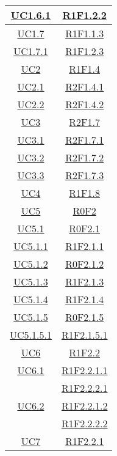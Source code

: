 \begin{longtable}{|c|c|}
	\hline
	\hyperlink{UC1.6.1}{UC1.6.1} & \hyperlink{R1F1.2.2}{R1F1.2.2}\\
	\hline
	\hyperlink{UC1.7}{UC1.7} & \hyperlink{R1F1.1.3}{R1F1.1.3}\\
	\hline
	\hyperlink{UC1.7.1}{UC1.7.1} & \hyperlink{R1F1.2.3}{R1F1.2.3}\\
	\hline
	\hyperlink{UC2}{UC2} & \hyperlink{R1F1.4}{R1F1.4}\\
	\hline
	\hyperlink{UC2.1}{UC2.1} & \hyperlink{R2F1.4.1}{R2F1.4.1}\\
	\hline
	\hyperlink{UC2.2}{UC2.2} & \hyperlink{R2F1.4.2}{R2F1.4.2}\\
	\hline
	\hyperlink{UC3}{UC3} & \hyperlink{R2F1.7}{R2F1.7}\\
	\hline
	\hyperlink{UC3.1}{UC3.1} & \hyperlink{R2F1.7.1}{R2F1.7.1}\\
	\hline
	\hyperlink{UC3.2}{UC3.2} & \hyperlink{R2F1.7.2}{R2F1.7.2}\\
	\hline
	\hyperlink{UC3.3}{UC3.3} & \hyperlink{R2F1.7.3}{R2F1.7.3}\\
	\hline
	\hyperlink{UC4}{UC4} & \hyperlink{R1F1.8}{R1F1.8}\\
	\hline
	\hyperlink{UC5}{UC5} & \hyperlink{R0F2}{R0F2}\\
	\hline
	\hyperlink{UC5.1}{UC5.1} & \hyperlink{R0F2.1}{R0F2.1}\\
	\hline
	\hyperlink{UC5.1.1}{UC5.1.1} & \hyperlink{R1F2.1.1}{R1F2.1.1}\\
	\hline
	\hyperlink{UC5.1.2}{UC5.1.2} & \hyperlink{R0F2.1.2}{R0F2.1.2}\\
	\hline
	\hyperlink{UC5.1.3}{UC5.1.3} & \hyperlink{R1F2.1.3}{R1F2.1.3}\\
	\hline
	\hyperlink{UC5.1.4}{UC5.1.4} & \hyperlink{R1F2.1.4}{R1F2.1.4}\\
	\hline
	\hyperlink{UC5.1.5}{UC5.1.5} & \hyperlink{R0F2.1.5}{R0F2.1.5}\\
	\hline
	\hyperlink{UC5.1.5.1}{UC5.1.5.1} & \hyperlink{R1F2.1.5.1}{R1F2.1.5.1}\\
	\hline
	\hyperlink{UC6}{UC6} & \hyperlink{R1F2.2}{R1F2.2}\\
	\hline
	\hyperlink{UC6.1}{UC6.1} & \hyperlink{R1F2.2.1.1}{R1F2.2.1.1}\\
	& \hyperlink{R1F2.2.2.1}{R1F2.2.2.1}\\
	\hline
	\hyperlink{UC6.2}{UC6.2} & \hyperlink{R1F2.2.1.2}{R1F2.2.1.2}\\
	& \hyperlink{R1F2.2.2.2}{R1F2.2.2.2}\\
	\hline
	\hyperlink{UC7}{UC7} & \hyperlink{R1F2.2.1}{R1F2.2.1}\\

\end{longtable}

